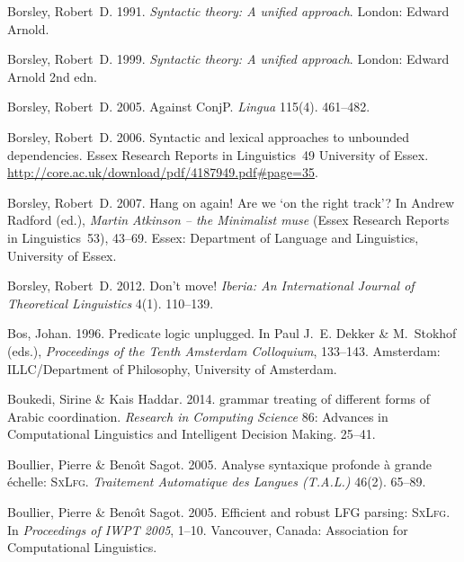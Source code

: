 \begin{thebibliography}{1420}
Borsley, Robert~D. 1991.
\newblock \emph{Syntactic theory: {A} unified approach}.
\newblock London: Edward Arnold.

Borsley, Robert~D. 1999.
\newblock \emph{Syntactic theory: {A} unified approach}.
\newblock London: Edward Arnold 2nd edn.

Borsley, Robert~D. 2005.
\newblock Against {ConjP}.
\newblock \emph{Lingua} 115(4). 461--482.

Borsley, Robert~D. 2006.
\newblock Syntactic and lexical approaches to unbounded dependencies.
\newblock Essex Research Reports in Linguistics~49 University of Essex.
\newblock \urlprefix\url{http://core.ac.uk/download/pdf/4187949.pdf#page=35}.

Borsley, Robert~D. 2007.
\newblock Hang on again! {Are} we `on the right track'?
\newblock In Andrew Radford (ed.), \emph{{Martin Atkinson} -- the {Minimalist}
  muse} (Essex Research Reports in Linguistics~53), 43--69. Essex: Department
  of Language and Linguistics, University of Essex.

Borsley, Robert~D. 2012.
\newblock Don't move!
\newblock \emph{Iberia: An International Journal of Theoretical Linguistics}
  4(1). 110--139.

Bos, Johan. 1996.
\newblock Predicate logic unplugged.
\newblock In Paul J.~E. Dekker \& M.~Stokhof (eds.), \emph{Proceedings of the
  {Tenth Amsterdam Colloquium}}, 133--143. Amsterdam: ILLC/Department of
  Philosophy, University of Amsterdam.

Boukedi, Sirine \& Kais Haddar. 2014.
 grammar treating of different forms of {Arabic} coordination.
\newblock \emph{Research in Computing Science} 86: {Advances} in Computational
  Linguistics and Intelligent Decision Making. 25--41.

Boullier, Pierre \& Beno{\^\i}t Sagot. 2005{}.
\newblock Analyse syntaxique profonde {\`a} grande {\'e}chelle: \textsc{SxLfg}.
\newblock \emph{Traitement Automatique des Langues (T.A.L.)} 46(2). 65--89.

Boullier, Pierre \& Beno{\^\i}t Sagot. 2005{}.
\newblock Efficient and robust {LFG} parsing: \textsc{SxLfg}.
\newblock In \emph{Proceedings of {IWPT 2005}}, 1--10. Vancouver, Canada:
  Association for Computational Linguistics.


\end{thebibliography}
